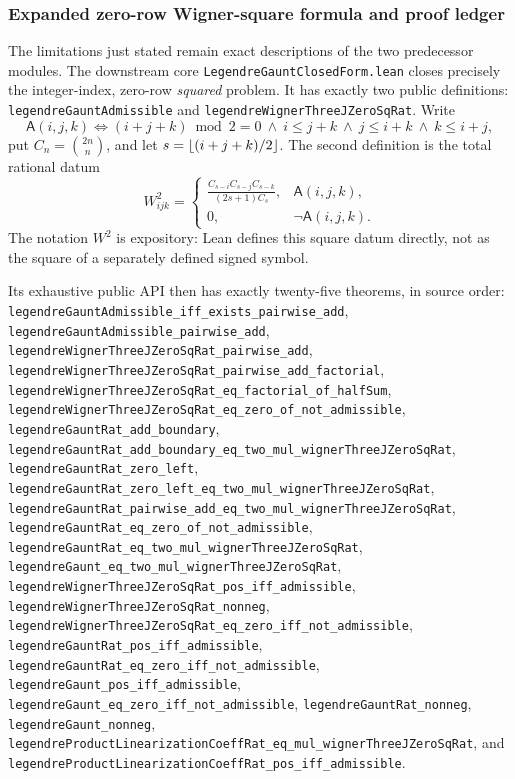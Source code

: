 \documentclass[11pt,oneside]{article}
\theoremstyle{definition}
\theoremstyle{remark}
\begin{document}
\subsubsection{Expanded zero-row Wigner-square formula and proof ledger}
\label{ch:legendre-gaunt-closed-form}

The limitations just stated remain exact descriptions of the two predecessor modules.
The downstream core \nolinkurl{LegendreGauntClosedForm.lean} closes precisely the
integer-index, zero-row \emph{squared} problem.  It has exactly two public definitions:
\nolinkurl{legendreGauntAdmissible} and
\nolinkurl{legendreWignerThreeJZeroSqRat}.  Write
\[
 \mathsf A(i,j,k)\Longleftrightarrow
 (i+j+k)\bmod 2=0\ \land\
 i\le j+k\ \land\ j\le i+k\ \land\ k\le i+j,
\]
put \(C_n=\binom{2n}{n}\), and let \(s=\left\lfloor (i+j+k)/2\right\rfloor\).  The second definition
is the total rational datum
\[
 W^2_{ijk}=
 \begin{cases}
 \displaystyle\frac{C_{s-i}C_{s-j}C_{s-k}}{(2s+1)C_s},
     &\mathsf A(i,j,k),\\[0.8em]
 0,&\neg\mathsf A(i,j,k).
 \end{cases}
\]
The notation \(W^2\) is expository: Lean defines this square datum directly, not as the
square of a separately defined signed symbol.

Its exhaustive public API then has exactly twenty-five theorems, in source order:
\nolinkurl{legendreGauntAdmissible_iff_exists_pairwise_add},
\nolinkurl{legendreGauntAdmissible_pairwise_add},
\nolinkurl{legendreWignerThreeJZeroSqRat_pairwise_add},
\nolinkurl{legendreWignerThreeJZeroSqRat_pairwise_add_factorial},
\nolinkurl{legendreWignerThreeJZeroSqRat_eq_factorial_of_halfSum},
\nolinkurl{legendreWignerThreeJZeroSqRat_eq_zero_of_not_admissible},
\nolinkurl{legendreGauntRat_add_boundary},
\nolinkurl{legendreGauntRat_add_boundary_eq_two_mul_wignerThreeJZeroSqRat},
\nolinkurl{legendreGauntRat_zero_left},
\nolinkurl{legendreGauntRat_zero_left_eq_two_mul_wignerThreeJZeroSqRat},
\nolinkurl{legendreGauntRat_pairwise_add_eq_two_mul_wignerThreeJZeroSqRat},
\nolinkurl{legendreGauntRat_eq_zero_of_not_admissible},
\nolinkurl{legendreGauntRat_eq_two_mul_wignerThreeJZeroSqRat},
\nolinkurl{legendreGaunt_eq_two_mul_wignerThreeJZeroSqRat},
\nolinkurl{legendreWignerThreeJZeroSqRat_pos_iff_admissible},
\nolinkurl{legendreWignerThreeJZeroSqRat_nonneg},
\nolinkurl{legendreWignerThreeJZeroSqRat_eq_zero_iff_not_admissible},
\nolinkurl{legendreGauntRat_pos_iff_admissible},
\nolinkurl{legendreGauntRat_eq_zero_iff_not_admissible},
\nolinkurl{legendreGaunt_pos_iff_admissible},
\nolinkurl{legendreGaunt_eq_zero_iff_not_admissible},
\nolinkurl{legendreGauntRat_nonneg},
\nolinkurl{legendreGaunt_nonneg},
\nolinkurl{legendreProductLinearizationCoeffRat_eq_mul_wignerThreeJZeroSqRat}, and
\nolinkurl{legendreProductLinearizationCoeffRat_pos_iff_admissible}.
\end{document}
